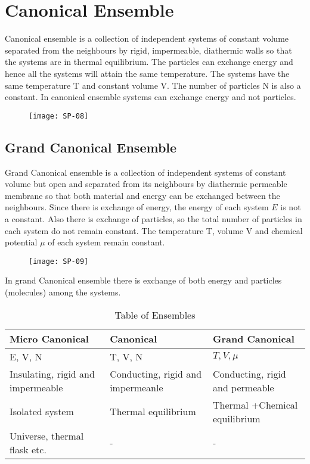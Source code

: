\section{Canonical Ensemble}
Canonical ensemble is a collection of independent systems of constant volume separated from the neighbours by rigid, impermeable, diathermic walls so that the systems are in thermal equilibrium. The particles can exchange energy and hence all the systems will attain the same temperature. The systems have the same temperature $\mathrm{T}$ and constant volume $\mathrm{V}$. The number of particles $\mathrm{N}$ is also a constant. In canonical ensemble systems can exchange energy and not particles. 
\begin{figure}[H]
	\centering
	\texttt{[image: SP-08]}
\end{figure}
\subsection{Grand Canonical Ensemble}
Grand Canonical ensemble is a collection of independent systems of constant volume but open and separated from its neighbours by diathermic permeable membrane so that both material and energy can be exchanged between the neighbours. Since there is exchange of energy, the energy of each system $E$ is not a constant. Also there is exchange of particles, so the total number of particles in each system do not remain constant. The temperature T, volume $\mathrm{V}$ and chemical potential $\mu$ of each system remain constant. 
\begin{figure}[H]
	\centering
	\texttt{[image: SP-09]}
\end{figure}
In grand Canonical ensemble there is exchange of both energy and particles (molecules) among the systems.



\begin{table}[H]
	\centering
	\renewcommand*{\arraystretch}{1.5}
\begin{tabular}{|p{5cm}|p{5cm}|p{5cm}|}
	\hline
	\textbf{Micro Canonical}&\textbf{Canonical}&\textbf{Grand Canonical}\\\hline
	E, V, N&T, V, N&$T, V, \mu $ \\\hline
	Insulating, rigid and impermeable&Conducting, rigid and impermeanle&Conducting, rigid and permeable \\\hline
	Isolated system &Thermal equilibrium &  Thermal +Chemical equilibrium \\\hline
	Universe, thermal flask etc.&-&-\\\hline
\end{tabular}
\caption{Table of Ensembles}
\end{table}

